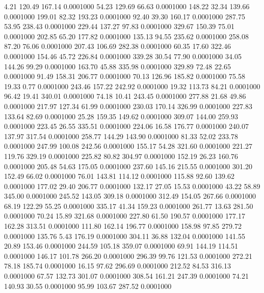    4.21  120.49  167.14   0.0001000
  54.23  129.69   66.63   0.0001000
 148.22   32.34  139.66   0.0001000
 199.01   82.32  193.23   0.0001000
  92.40   39.30  160.17   0.0001000
 287.75   53.95  238.43   0.0001000
 229.44  137.27   97.83   0.0001000
 329.67  150.39   75.01   0.0001000
 202.85   65.20  177.82   0.0001000
 135.13   94.55  235.62   0.0001000
 258.08   87.20   76.06   0.0001000
 207.43  106.69  282.38   0.0001000
  60.35   17.60  322.46   0.0001000
 154.46   45.72  226.84   0.0001000
 339.28   30.54   77.90   0.0001000
  34.05  144.26   99.29   0.0001000
 163.70   45.88  335.98   0.0001000
 329.89   72.48   22.65   0.0001000
  91.49  158.31  206.77   0.0001000
  70.13  126.96  185.82   0.0001000
  75.58   19.33    0.77   0.0001000
 243.46  157.22  242.92   0.0001000
  19.32  113.73   84.21   0.0001000
  96.42   19.41  340.01   0.0001000
  74.18   10.41  243.45   0.0001000
 277.88   21.68   49.86   0.0001000
 217.97  127.34   61.99   0.0001000
 230.03  170.14  326.99   0.0001000
 227.83  133.64   82.69   0.0001000
  25.28  159.35  149.62   0.0001000
 309.07  144.00  259.93   0.0001000
 223.45   26.55  335.51   0.0001000
 224.06   16.58  176.77   0.0001000
 240.07  137.97  317.54   0.0001000
 258.77  144.29  143.90   0.0001000
  81.33   52.02  233.78   0.0001000
 247.99  100.08  242.56   0.0001000
 155.17   54.28  321.60   0.0001000
 221.27  119.76  329.19   0.0001000
 225.82   80.82  304.97   0.0001000
 152.19   26.23  160.76   0.0001000
 205.48   54.63  175.05   0.0001000
 237.60  145.16  215.55   0.0001000
 301.20  152.49   66.02   0.0001000
  76.01  143.81  114.12   0.0001000
 115.88   92.60  139.62   0.0001000
 177.02   29.40  206.77   0.0001000
 132.17   27.05   15.53   0.0001000
  43.22   58.89  345.00   0.0001000
 245.52  143.05  309.18   0.0001000
 312.49  154.05  267.66   0.0001000
  68.19  122.29   55.25   0.0001000
 335.17   41.34  159.23   0.0001000
 261.77   13.63  281.50   0.0001000
  70.24   15.89  321.68   0.0001000
 227.80   61.50  190.57   0.0001000
 177.17  162.28  313.51   0.0001000
 111.80  162.14  196.77   0.0001000
 158.98   97.85  279.72   0.0001000
 135.76    5.43  176.19   0.0001000
 304.11   36.88  132.04   0.0001000
 141.55   20.89  153.46   0.0001000
 244.59  105.18  359.07   0.0001000
  69.91  144.19  114.51   0.0001000
 146.17  101.78  266.20   0.0001000
 296.39   99.76  121.53   0.0001000
 272.21   78.18  185.74   0.0001000
  16.15   97.62  296.69   0.0001000
 212.52   84.53  316.13   0.0001000
  67.57  132.73  301.07   0.0001000
 308.54  161.21  247.39   0.0001000
  74.21  140.93   30.55   0.0001000
  95.99  103.67  287.52   0.0001000
